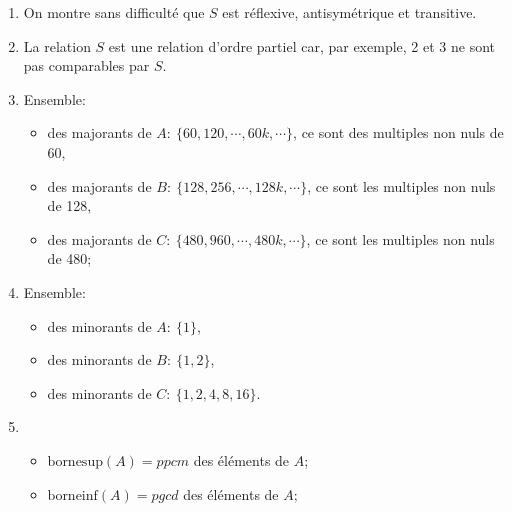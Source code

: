     \begin{enumerate}
        \item On montre sans difficulté que $S$ est réflexive, antisymétrique et transitive.
        \item La relation $S$ est une relation d'ordre partiel car, par exemple, 2 et 3 ne sont pas comparables par $S$.
        \item Ensemble: \begin{itemize}
            \item des majorants de $A:\ \{60, 120, \cdots, 60k, \cdots\}$, ce sont des multiples non nuls de 60,
            \item des majorants de $B:\ \{128, 256, \cdots, 128k, \cdots\}$, ce sont les multiples non nuls de 128,
            \item des majorants de $C:\ \{480, 960, \cdots, 480k, \cdots\}$, ce sont les multiples non nuls de 480;
        \end{itemize}
        \item Ensemble: \begin{itemize}
            \item des minorants de $A:\ \{1\}$,
            \item des minorants de $B:\ \{1, 2\}$,
            \item des minorants de $C:\ \{1, 2, 4, 8, 16\}$.
        \end{itemize}
        \item \begin{itemize}
            \item  $\text{bornesup}(A)=ppcm$ des éléments de $A$;
            \item  $\text{borneinf}(A)=pgcd$ des éléments de $A$;
        \end{itemize}
    \end{enumerate}
